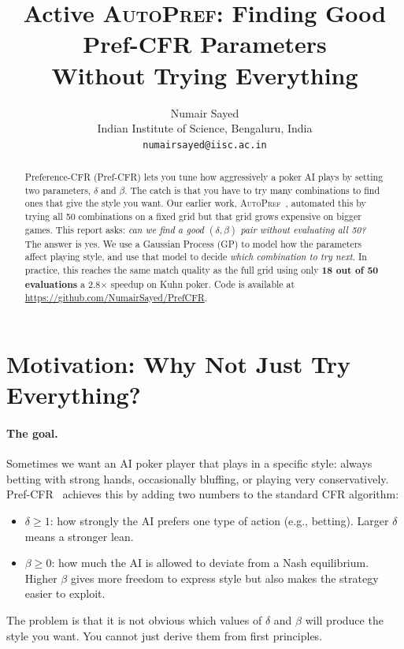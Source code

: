 \documentclass{article}
\title{Active \textsc{AutoPref}: Finding Good Pref-CFR Parameters\\
       Without Trying Everything}
\author{%
  Numair Sayed \\
  Indian Institute of Science, Bengaluru, India \\
  \texttt{numairsayed@iisc.ac.in}
}
\begin{document}
\maketitle

\begin{abstract}
Preference-CFR (Pref-CFR) lets you tune how aggressively a poker AI plays by
setting two parameters, $\delta$ and $\beta$.  The catch is that you have to
try many combinations to find ones that give the style you want.  Our earlier
work, \textsc{AutoPref}~\cite{sayed2025prefcfr}, automated this by trying all
50 combinations on a fixed grid but that grid grows expensive on bigger games.
This report asks: \emph{can we find a good $(\delta,\beta)$ pair without
evaluating all 50?}  The answer is yes.  We use a Gaussian Process (GP) to
model how the parameters affect playing style, and use that model to decide
\emph{which combination to try next}.  In practice, this reaches the same match
quality as the full grid using only \textbf{18 out of 50 evaluations} a
2.8$\times$ speedup on Kuhn poker.
Code is available at \url{https://github.com/NumairSayed/PrefCFR}.
\end{abstract}

\section{Motivation: Why Not Just Try Everything?}
\label{sec:intro}

\paragraph{The goal.}
Sometimes we want an AI poker player that plays in a specific style: always
betting with strong hands, occasionally bluffing, or playing very
conservatively.  Pref-CFR~\cite{ju2025prefcfr} achieves this by adding two
numbers to the standard CFR algorithm:
\begin{itemize}
  \item $\delta \ge 1$: how strongly the AI prefers one type of action (e.g.,
    betting).  Larger $\delta$ means a stronger lean.
  \item $\beta \ge 0$: how much the AI is allowed to deviate from a Nash
    equilibrium.  Higher $\beta$ gives more freedom to express style but also
    makes the strategy easier to exploit.
\end{itemize}
The problem is that it is not obvious which values of $\delta$ and $\beta$ will
produce the style you want.  You cannot just derive them from first principles.
\end{document}

